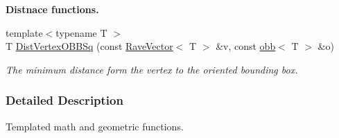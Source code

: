 \begin{Indent}{\bf Distnace functions.}\par
{\em \label{_amgrpb5b6051cc2ee505e55561aa9d30eee1e}
 }\begin{DoxyCompactItemize}
\item 
\hypertarget{group__geometric__primitives_ga9b1575cfd9a4571c57d72449b303ba6e}{
{\footnotesize template$<$typename T $>$ }\\T \hyperlink{group__geometric__primitives_ga9b1575cfd9a4571c57d72449b303ba6e}{DistVertexOBBSq} (const \hyperlink{classOpenRAVE_1_1geometry_1_1RaveVector}{RaveVector}$<$ T $>$ \&v, const \hyperlink{classOpenRAVE_1_1geometry_1_1obb}{obb}$<$ T $>$ \&o)}
\label{group__geometric__primitives_ga9b1575cfd9a4571c57d72449b303ba6e}

\begin{DoxyCompactList}\small\item\em The minimum distance form the vertex to the oriented bounding box. \item\end{DoxyCompactList}\end{DoxyCompactItemize}
\end{Indent}


\subsubsection{Detailed Description}
Templated math and geometric functions. 